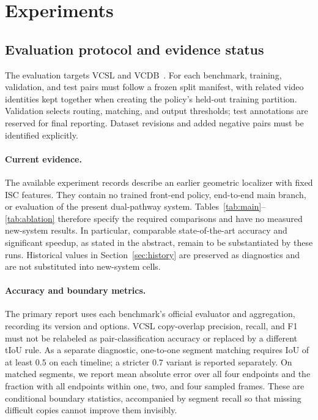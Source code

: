 \section{Experiments}
\label{sec:exp}

\subsection{Evaluation protocol and evidence status}
The evaluation targets VCSL and VCDB~\cite{vcsl2022,jiang2014}. For each benchmark, training,
validation, and test pairs must follow a frozen split manifest, with related video identities
kept together when creating the policy's held-out training partition. Validation selects
routing, matching, and output thresholds; test annotations are reserved for final reporting.
Dataset revisions and added negative pairs must be identified explicitly.

\paragraph{Current evidence.}
The available experiment records describe an earlier geometric localizer with fixed ISC
features. They contain no trained front-end policy, end-to-end main branch, or evaluation
of the present dual-pathway system. Tables~\ref{tab:main}--\ref{tab:ablation} therefore specify
the required comparisons and have no measured new-system results. In particular, comparable
state-of-the-art accuracy and significant speedup, as stated in the abstract, remain to be
substantiated by these runs. Historical values in Section~\ref{sec:history} are preserved as
diagnostics and are not substituted into new-system cells.

\paragraph{Accuracy and boundary metrics.}
The primary report uses each benchmark's official evaluator and aggregation, recording its
version and options. VCSL copy-overlap precision, recall, and F1 must not be relabeled as
pair-classification accuracy or replaced by a different tIoU rule. As a separate diagnostic,
one-to-one segment matching requires IoU of at least $0.5$ on each timeline; a stricter
$0.7$ variant is reported separately. On matched segments, we report mean absolute error
over all four endpoints and the fraction with all endpoints within one, two, and four
sampled frames. These are conditional boundary statistics, accompanied by segment recall
so that missing difficult copies cannot improve them invisibly.

